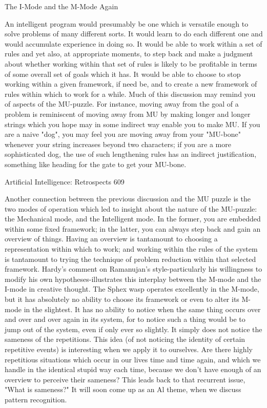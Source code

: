 {                           The I-Mode and the M-Mode Again

An intelligent program would presumably be one which is versatile enough to solve
problems of many different sorts. It would learn to do each different one and would
accumulate experience in doing so. It would be able to work within a set of rules and yet
also, at appropriate moments, to step back and make a judgment about whether working
within that set of rules is likely to be profitable in terms of some overall set of goals
which it has. It would be able to choose to stop working within a given framework, if
need be, and to create a new framework of rules within which to work for a while.
        Much of this discussion may remind you of aspects of the MU-puzzle. For
instance, moving away from the goal of a problem is reminiscent of moving away from
MU by making longer and longer strings which you hope may in some indirect way
enable you to make MU. If you are a naive "dog", you may feel you are moving away
from your "MU-bone" whenever your string increases beyond two characters; if you are a
more sophisticated dog, the use of such lengthening rules has an indirect justification,
something like heading for the gate to get your MU-bone.




Artificial Intelligence: Retrospects                                                      609

        Another connection between the previous discussion and the MU puzzle is the
two modes of operation which led to insight about the nature of the MU-puzzle: the
Mechanical mode, and the Intelligent mode. In the former, you are embedded within
some fixed framework; in the latter, you can always step back and gain an overview of
things. Having an overview is tantamount to choosing a representation within which to
work; and working within the rules of the system is tantamount to trying the technique of
problem reduction within that selected framework. Hardy's comment on Ramanujan's
style-particularly his willingness to modify his own hypotheses-illustrates this interplay
between the M-mode and the I-mode in creative thought.
        The Sphex wasp operates excellently in the M-mode, but it has absolutely no
ability to choose its framework or even to alter its M-mode in the slightest. It has no
ability to notice when the same thing occurs over and over and over again in its system,
for to notice such a thing would be to jump out of the system, even if only ever so
slightly. It simply does not notice the sameness of the repetitions. This idea (of not
noticing the identity of certain repetitive events) is interesting when we apply it to
ourselves. Are there highly repetitious situations which occur in our lives time and time
again, and which we handle in the identical stupid way each time, because we don't have
enough of an overview to perceive their sameness? This leads back to that recurrent
issue, "What is sameness?" It will soon come up as an Al theme, when we discuss pattern
recognition.

}
